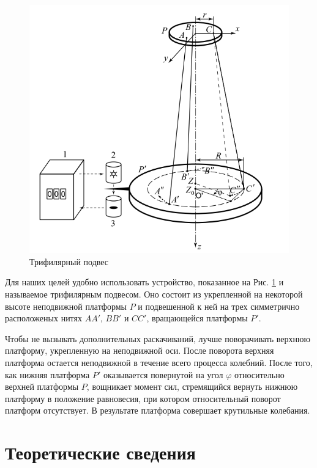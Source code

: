 \documentclass[a4paper,14pt]{extarticle}
\begin{document}
	\begin{figure}
		\includegraphics[width=0.95\linewidth]{ustan.png}
		\caption[]{Трифилярный подвес\footnotemark}
		\label{ust}
	\end{figure}

	Для наших целей удобно использовать устройство, показанное на Рис. \ref{ust} и называемое трифилярным подвесом. Оно состоит из укрепленной на некоторой высоте неподвижной платформы $P$ и подвешенной к ней на трех симметрично расположеных нитях $AA'$, $BB'$ и $CC'$, вращающейся платформы $P'$. 
	
	Чтобы не вызывать дополнительных раскачиваний, лучше поворачивать верхнюю платформу, укрепленную на неподвижной оси. После поворота верхняя платформа остается неподвижной в течение всего процесса колебний. После того, как нижняя платформа $P'$ оказывается повернутой на угол $\varphi$ относительно верхней платформы $P$, вощникает момент сил, стремящийся вернуть нижнюю платформу в положение равновесия, при котором относительный поворот платформ отсутствует. В результате платформа совершает крутильные колебания.
	
	
	\section{Теоретические сведения}
	
\end{document}
